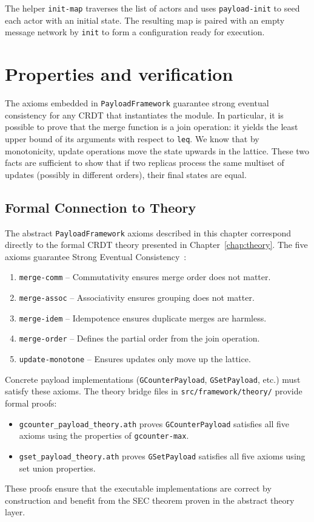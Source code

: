 The helper \lstinline{init-map} traverses the list of actors and uses \lstinline{payload-init} to seed each actor with an initial state. The resulting map is paired with an empty message network by \lstinline{init} to form a configuration ready for execution.

\section{Properties and verification}

The axioms embedded in \texttt{PayloadFramework} guarantee strong eventual consistency for any CRDT that instantiates the module. In particular, it is possible to prove that the merge function is a join operation: it yields the least upper bound of its arguments with respect to \texttt{leq}. We know that by monotonicity, update operations move the state upwards in the lattice. These two facts are sufficient to show that if two replicas process the same multiset of updates (possibly in different orders), their final states are equal. %

\subsection{Formal Connection to Theory}

The abstract \texttt{PayloadFramework} axioms described in this chapter correspond directly to the formal CRDT theory presented in Chapter~\ref{chap:theory}. The five axioms guarantee Strong Eventual Consistency~\cite{shapiro2011conflict}:

\begin{enumerate}
  \item \texttt{merge-comm} -- Commutativity ensures merge order does not matter.
  \item \texttt{merge-assoc} -- Associativity ensures grouping does not matter.
  \item \texttt{merge-idem} -- Idempotence ensures duplicate merges are harmless.
  \item \texttt{merge-order} -- Defines the partial order from the join operation.
  \item \texttt{update-monotone} -- Ensures updates only move up the lattice.
\end{enumerate}

Concrete payload implementations (\texttt{GCounterPayload}, \texttt{GSetPayload}, etc.) must satisfy these axioms. The theory bridge files in \texttt{src/framework/theory/} provide formal proofs:

\begin{itemize}
  \item \texttt{gcounter\_payload\_theory.ath} proves \texttt{GCounterPayload} satisfies all five axioms using the properties of \texttt{gcounter-max}.
  \item \texttt{gset\_payload\_theory.ath} proves \texttt{GSetPayload} satisfies all five axioms using set union properties.
\end{itemize}

These proofs ensure that the executable implementations are correct by construction and benefit from the SEC theorem proven in the abstract theory layer.

\endinput
